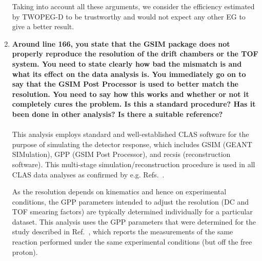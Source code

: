 \documentclass[,superscriptaddress,showpacs,amssymb,amsmath,amsfonts,linenumbers,article]{revtex4-1}
\begin{document}
\begin{enumerate}[label=\textbf{\arabic*}.]
Taking into account all these arguments, we consider the efficiency estimated by TWOPEG-D to be trustworthy and would not expect any other EG to give a better result.




\item {\bf Around line 166, you state that the GSIM package does not properly reproduce the resolution of the drift chambers or the TOF system. You need to state clearly how bad the mismatch is and what its effect on the data analysis is. You immediately go on to say that the GSIM Post Processor is used to better match the resolution. You need to say how this works and whether or not it completely cures the problem. Is this a standard procedure? Has it been done in other analysis? Is there a suitable reference?}\\ \\
This analysis employs standard and well-established CLAS software for the purpose of simulating the detector response, which includes GSIM (GEANT SIMulation), GPP (GSIM Post Processor), and recsis (reconstruction software). This multi-stage simulation/reconstruction procedure is used in all CLAS data analyses as confirmed by e.g. Refs.~\cite{Markov:2014, Arjun, Ye_Tian:2017}.

As the resolution depends on kinematics and hence on experimental conditions, the GPP parameters intended to adjust the resolution (DC and TOF smearing factors) are typically determined individually for a particular dataset. This analysis uses the GPP parameters that were determined for the study described in Ref.~\cite{fedotov_prc}, which reports the measurements of the same reaction performed under the same experimental conditions (but off the free proton).


\end{enumerate}
\end{document}
